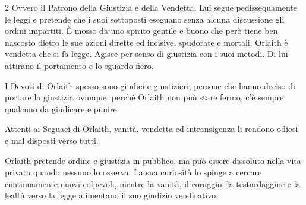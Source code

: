\begin{multicols}{2}
Ovvero il Patrono della Giustizia e della Vendetta. Lui segue pedissequamente le leggi e pretende che i suoi sottoposti eseguano senza alcuna discussione gli ordini impartiti. È mosso da uno spirito gentile e buono che però tiene ben nascosto dietro le sue azioni dirette ed incisive, spudorate e mortali. Orlaith è vendetta che si fa legge. Agisce per senso di giustizia con i suoi metodi. Di lui attirano il portamento e lo sguardo fiero.

I Devoti di Orlaith spesso sono giudici e giustizieri, persone che hanno deciso di portare la giustizia ovunque, perché Orlaith non può stare fermo, c'è sempre qualcuno da giudicare e punire.

Attenti ai Seguaci di Orlaith, vanità, vendetta ed intransigenza li rendono odiosi e mal disposti verso tutti.

Orlaith pretende ordine e giustizia in pubblico, ma può essere dissoluto nella vita privata quando nessuno lo osserva. La sua curiosità lo spinge a cercare continuamente nuovi colpevoli, mentre la vanità, il coraggio, la testardaggine e la lealtà verso la legge alimentano il suo giudizio vendicativo.


\end{multicols}
